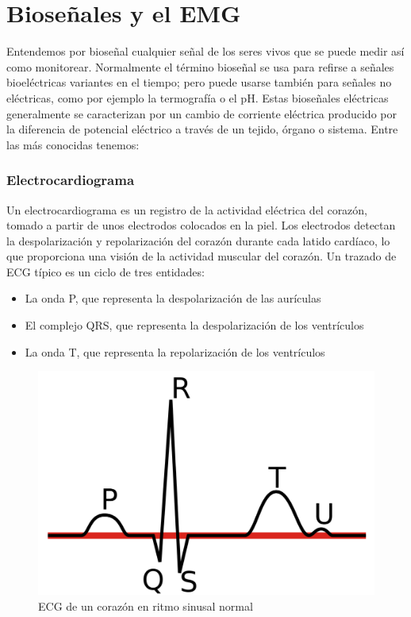 \section{Bioseñales y el EMG}

Entendemos por bioseñal cualquier señal de los seres vivos que se puede medir así como monitorear. Normalmente el término bioseñal se usa para refirse a señales bioeléctricas variantes en el tiempo; pero puede usarse también para señales no eléctricas, como por ejemplo la termografía o el pH. 
 Estas bioseñales eléctricas generalmente  se caracterizan por un cambio de corriente eléctrica producido por la diferencia de potencial eléctrico a través de un tejido, órgano o sistema. Entre las más conocidas tenemos: 

\subsubsection{Electrocardiograma}

Un electrocardiograma es un registro de la actividad eléctrica del corazón, tomado a partir de unos electrodos colocados en la piel. Los electrodos detectan la despolarización y repolarización del corazón durante cada latido cardíaco, lo que proporciona una visión de la actividad muscular del corazón. 
Un trazado de ECG típico es un ciclo de tres entidades:

\begin{itemize}
	\item La onda P, que representa la despolarización de las aurículas
	\item El complejo QRS, que representa la despolarización de los ventrículos 
 	\item La onda T, que representa la repolarización de los ventrículos
\end{itemize}

\begin{figure}[H]
	\center
	\includegraphics[scale=0.1]{imagenes/EstadodelArte/ECG.png}
	\caption{ECG de un corazón en ritmo sinusal normal}
	\label{fig:ECG}
\end{figure}
 

